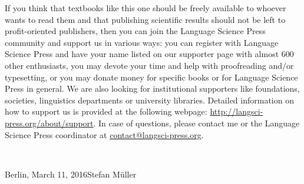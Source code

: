 If you think that textbooks like this one should be freely available to whoever wants to read them
and that publishing scientific results should not be left to profit-oriented publishers, then you
can join the Language Science Press community and support us in various ways: you can register with Language Science Press and have your name
listed on our supporter page with almost 600 other enthusiasts, you may devote your time and help
with proofreading and/or typesetting, or you may donate money for specific books or for Language
Science Press in general. We are also looking for institutional supporters like foundations,
societies, linguistics departments or university libraries. Detailed information on how to support
us is provided at the following webpage: \url{http://langsci-press.org/about/support}.
In case of questions, please contact me or the Language Science Press coordinator at \href{mailto:contact@langsci-press.org}{contact@langsci-press.org}.


~\medskip

\noindent
Berlin, March 11, 2016\hfill Stefan Müller


